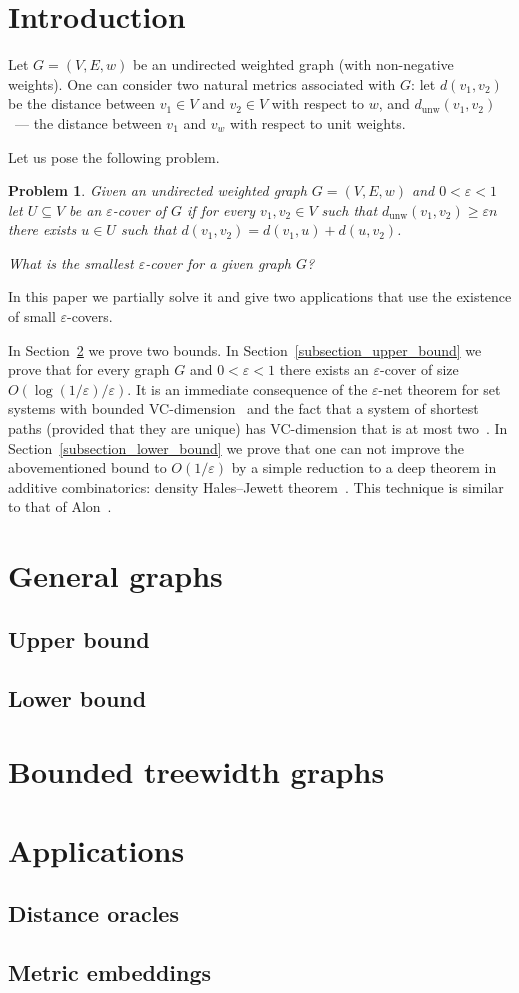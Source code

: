 \documentclass{article}
\newcommand{\dunw}{d_{\mathrm{unw}}}
\newcommand{\eps}{\varepsilon}
\newtheorem{problem}{Problem}
\begin{document}
    \section{Introduction}

    Let $G = (V, E, w)$ be an undirected weighted graph (with non-negative weights). One can consider two natural metrics
    associated with $G$: let $d(v_1, v_2)$ be the distance between $v_1 \in V$ and $v_2 \in V$ with respect to $w$,
    and $\dunw(v_1, v_2)$~--- the distance between $v_1$ and $v_w$ with respect to unit weights.

    Let us pose the following problem.
    \begin{problem}
        Given an undirected weighted graph $G = (V, E, w)$ and $0 < \eps < 1$ let $U \subseteq V$ be \emph{an $\eps$-cover}
        of $G$ if for every $v_1, v_2 \in V$ such that $\dunw(v_1, v_2) \geq \eps n$ there exists $u \in U$
        such that $d(v_1, v_2) = d(v_1, u) + d(u, v_2)$.

        What is the smallest $\eps$-cover for a given graph $G$?
    \end{problem}

    In this paper we partially solve it and give two applications that use the existence of small $\eps$-covers.

    In Section~\ref{section_general_graphs} we prove two bounds. In Section~\ref{subsection_upper_bound}
    we prove that for every graph $G$ and $0 < \eps < 1$ there exists an $\eps$-cover of size $O(\log(1 / \eps) / \eps)$.
    It is an immediate consequence of the $\eps$-net theorem for set systems with bounded VC-dimension~\cite{HW86}
    and the fact that a system of shortest paths (provided that they are unique) has VC-dimension
    that is at most two~\cite{ADFGW11}.
    In Section~\ref{subsection_lower_bound} we prove that one can not improve the abovementioned bound
    to $O(1 / \eps)$ by a simple reduction to a deep theorem in additive combinatorics: density Hales--Jewett
    theorem~\cite{P09}. This technique is similar to that of Alon~\cite{A10}.

    \section{General graphs}
    \label{section_general_graphs}
    \subsection{Upper bound}
    \subsection{Lower bound}
    \section{Bounded treewidth graphs}
    \section{Applications}
    \subsection{Distance oracles}
    \subsection{Metric embeddings}
    
    
\end{document}
